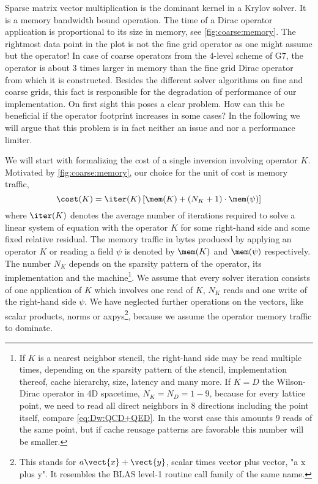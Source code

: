 Sparse matrix vector multiplication is the dominant kernel in a Krylov solver.
It is a memory bandwidth bound operation.
The time of a Dirac operator application is proportional to its size in memory, see \cref{fig:coarse:memory}.
The rightmost data point in the plot is not the fine grid operator as one might assume but the  operator!
In case of coarse operators from the 4-level scheme of G7, the  operator is about \num{3} times larger in memory than the fine grid Dirac operator from which it is constructed.
Besides the different solver algorithms on fine and coarse grids, this fact is responsible for the degradation of performance of our implementation.
On first sight this poses a clear problem.
How can this be beneficial if the operator footprint increases in some cases?
In the following we will argue that this problem is in fact neither an issue and nor a performance limiter.

We will start with formalizing the cost of a single inversion involving operator $K$.
Motivated by \cref{fig:coarse:memory}, our choice for the unit of cost is memory traffic,
\begin{equation} \label{eq:numerics:perf:cost:single:rhs}
\cost(K) = \iter(K) \left[ \mem(K) + (N_{K} + 1) \cdot \mem(\psi) \right]
\end{equation}
where $\iter(K)$ denotes the average number of iterations required to solve a linear system of equation with the operator $K$ for some right-hand side and some fixed relative residual.
The memory traffic in bytes produced by applying an operator $K$ or reading a field $\psi$ is denoted by $\mem(K)$ and $\mem(\psi)$ respectively.
The number $N_K$ depends on the sparsity pattern of the operator, its implementation and the machine\footnote{If $K$ is a nearest neighbor stencil, the right-hand side may be read multiple times, depending on the sparsity pattern of the stencil, implementation thereof, cache hierarchy, size, latency and many more. If $K=D$ the Wilson-Dirac operator in 4D spacetime, $N_K = N_D = 1-9$, because for every lattice point, we need to read all direct neighbors in \num{8} directions including the point itself, compare \cref{eq:Dw:QCD+QED}. In the worst case this amounts \num{9} reads of the same point, but if cache reusage patterns are favorable this number will be smaller.}.
We assume that every solver iteration consists of one application of $K$ which involves one read of $K$, $N_K$ reads and one write of the right-hand side $\psi$.
We have neglected further operations on the vectors, like scalar products, norms or axpys\footnote{This stands for $a \vect{x} + \vect{y}$, scalar times vector plus vector, "a x plus y". It resembles the BLAS level-1 routine call family of the same name.}, because we assume the operator memory traffic to dominate.

